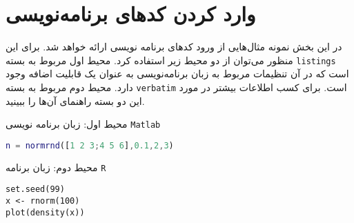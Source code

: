 
\chapter{وارد کردن کدهای برنامه‌نویسی}\label{App:Programming Code}
\thispagestyle{empty}

در این بخش نمونه مثال‌هایی از ورود کدهای برنامه نویسی ارائه خواهد شد. برای این منظور می‌توان از دو محیط زیر استفاده کرد. محیط اول مربوط به بسته 
\verb|listings|
 است که در آن تنظیمات مربوط به زبان برنامه‌نویسی به عنوان یک قابلیت اضافه وجود دارد. محیط دوم مربوط به بسته 
 \verb|verbatim|
 است. برای کسب اطلاعات بیشتر در مورد این دو بسته راهنمای آن‌ها را ببینید.
 
 محیط اول: زبان برنامه نویسی 
 \verb|Matlab|
\begin{latin}
\begin{lstlisting}[language=Matlab]
n = normrnd([1 2 3;4 5 6],0.1,2,3)
\end{lstlisting}
\end{latin}

محیط دوم: زبان برنامه 
 \verb|R|
 
 \begin{latin}
 \begin{verbatim}
set.seed(99)
x <- rnorm(100)
plot(density(x))
\end{verbatim}
 \end{latin}
